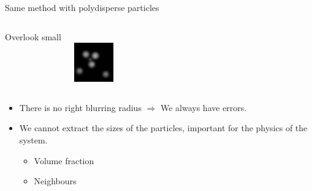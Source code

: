 \begin{frame}{Same method with polydisperse particles}
\begin{columns}[T]
	\centering
	{\strut{}Overlook small}\\
	\includegraphics[width=\textwidth]{dillute_smaller_blur1_5}
	\end{columns}
	\begin{itemize}
	\item There is no \alert{right} blurring radius $\Rightarrow$ We always have errors.
	\item We cannot extract the sizes of the particles, important for the physics of the system.
	\begin{itemize}
		\item Volume fraction
		\item Neighbours
	\end{itemize}
	\end{itemize}
\end{frame}

